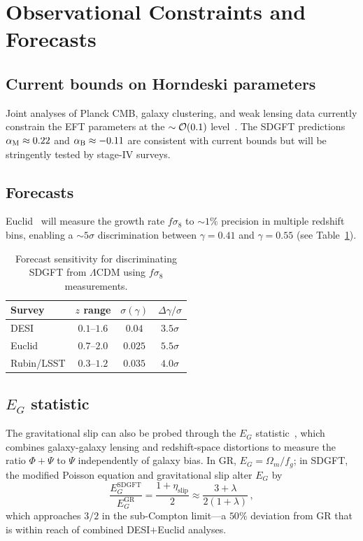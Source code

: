 \documentclass[amsmath,amssymb,aps,prd,twocolumn,superscriptaddress,nofootinbib]{revtex4-2}
\begin{document}
\section{Observational Constraints and Forecasts}
\label{sec:observational}

\subsection{Current bounds on Horndeski parameters}

Joint analyses of Planck CMB, galaxy clustering, and weak lensing
data currently constrain the EFT parameters at the $\sim
\mathcal{O}\!\left(0.1\right)$ level~\cite{Noller2019,Planck2018_MG}.  The SDGFT
predictions $\alpha_{\mathrm{M}} \approx 0.22$ and $\alpha_{\mathrm{B}} \approx -0.11$ are
consistent with current bounds but will be stringently tested
by stage-IV surveys.

\subsection{Forecasts}

Euclid~\cite{Euclid2020} will measure the growth rate $f\sigma_8$
to $\sim 1\%$ precision in multiple redshift bins, enabling a
$\sim 5\sigma$ discrimination between $\gamma = 0.41$ and
$\gamma = 0.55$ (see Table~\ref{tab:forecasts}).

\begin{table}[t]
\centering
\caption{Forecast sensitivity for discriminating SDGFT from
$\Lambda$CDM using $f\sigma_8$ measurements.}
\label{tab:forecasts}
\begin{tabular}{@{}lccc@{}}
\toprule
Survey & $z$ range & $\sigma(\gamma)$ & $\Delta\gamma/\sigma$ \\
\midrule
DESI & $0.1$--$1.6$ & $0.04$ & $3.5\sigma$ \\
Euclid & $0.7$--$2.0$ & $0.025$ & $5.5\sigma$ \\
Rubin/LSST & $0.3$--$1.2$ & $0.035$ & $4.0\sigma$ \\
\bottomrule
\end{tabular}
\end{table}

\subsection{$E_G$ statistic}

The gravitational slip can also be probed through the $E_G$
statistic~\cite{Zhang2007}, which combines galaxy-galaxy lensing
and redshift-space distortions to measure the ratio
$\Phi + \Psi$ to $\Psi$ independently of galaxy bias.  In GR,
$E_G = \Omega_m/f_g$; in SDGFT, the modified Poisson equation
and gravitational slip alter $E_G$ by
\begin{equation}
  \frac{E_G^{\mathrm{SDGFT}}}{E_G^{\mathrm{GR}}}
    = \frac{1 + \eta_{\mathrm{slip}}}{2}
    \approx \frac{3 + \lambda}{2(1+\lambda)}\,,
  \label{eq:EG_ratio}
\end{equation}
which approaches $3/2$ in the sub-Compton limit---a $50\%$
deviation from GR that is within reach of combined DESI$+$Euclid
analyses.
\end{document}
